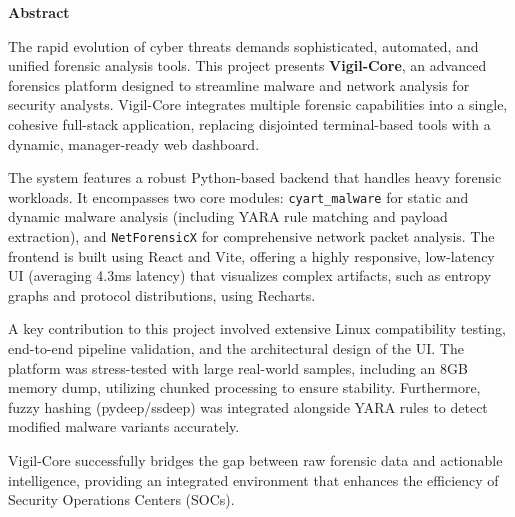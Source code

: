 \begin{center}
\Large{\textbf{Abstract}}
\end{center}
\vspace{0.5cm}

The rapid evolution of cyber threats demands sophisticated, automated, and unified forensic analysis tools. This project presents \textbf{Vigil-Core}, an advanced forensics platform designed to streamline malware and network analysis for security analysts. Vigil-Core integrates multiple forensic capabilities into a single, cohesive full-stack application, replacing disjointed terminal-based tools with a dynamic, manager-ready web dashboard.

The system features a robust Python-based backend that handles heavy forensic workloads. It encompasses two core modules: \texttt{cyart\_malware} for static and dynamic malware analysis (including YARA rule matching and payload extraction), and \texttt{NetForensicX} for comprehensive network packet analysis. The frontend is built using React and Vite, offering a highly responsive, low-latency UI (averaging 4.3ms latency) that visualizes complex artifacts, such as entropy graphs and protocol distributions, using Recharts.

A key contribution to this project involved extensive Linux compatibility testing, end-to-end pipeline validation, and the architectural design of the UI. The platform was stress-tested with large real-world samples, including an 8GB memory dump, utilizing chunked processing to ensure stability. Furthermore, fuzzy hashing (pydeep/ssdeep) was integrated alongside YARA rules to detect modified malware variants accurately. 

Vigil-Core successfully bridges the gap between raw forensic data and actionable intelligence, providing an integrated environment that enhances the efficiency of Security Operations Centers (SOCs).
